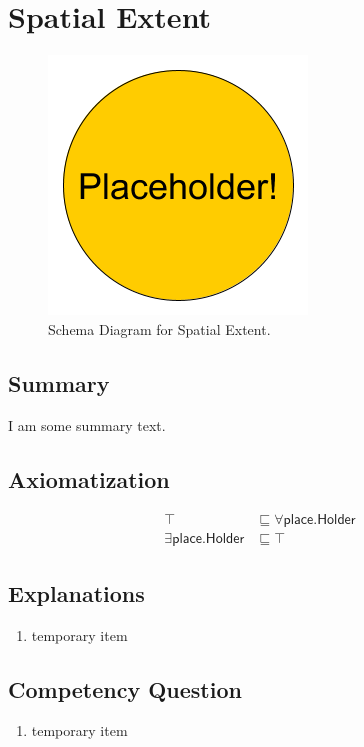 \section{Spatial Extent}
\label{sec:Spatial}
\begin{figure}[h!]
\begin{center}
\includegraphics[width=.4\textwidth]{figures/placeholder}
\end{center}
\caption{Schema Diagram for Spatial Extent.}
\label{fig:Spatial}
\end{figure}
\subsection{Summary}
\label{sum:Spatial}
I am some summary text.

\subsection{Axiomatization}
\label{axs:Spatial}
\begin{align}
\top &\sqsubseteq \forall\textsf{place.Holder} \\ 
\exists\textsf{place.Holder} &\sqsubseteq \top 
\end{align}

\subsection{Explanations}
\label{exp:Spatial}
\begin{enumerate}
\item temporary item
\end{enumerate}

\subsection{Competency Question}
\label{cqs:Spatial}
\begin{enumerate}[CQ1.]
\item temporary item
\end{enumerate}

\newpage
